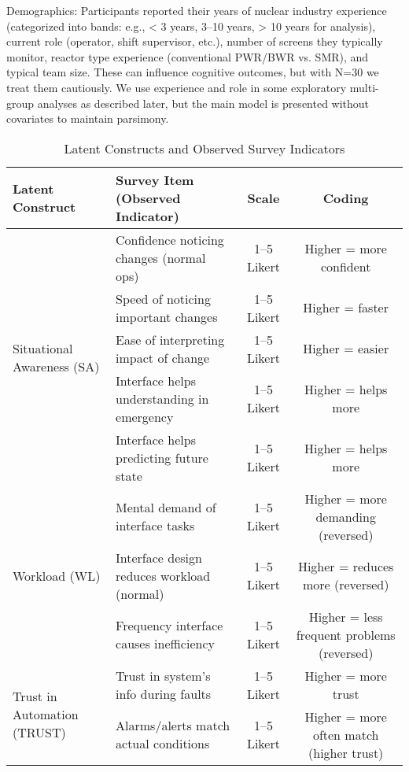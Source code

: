 \documentclass[conference]{IEEEtran}
\begin{document}
Demographics: Participants reported their years of nuclear industry experience (categorized into bands: e.g., < 3 years, 3–10 years, > 10 years for analysis), current role (operator, shift supervisor, etc.), number of screens they typically monitor, reactor type experience (conventional PWR/BWR vs. SMR), and typical team size. These can influence cognitive outcomes, but with N=30 we treat them cautiously. We use experience and role in some exploratory multi-group analyses as described later, but the main model is presented without covariates to maintain parsimony.

\begin{table*}[t]
\caption{Latent Constructs and Observed Survey Indicators}
\centering
\begin{tabular}{llcc}
\toprule
Latent Construct & Survey Item (Observed Indicator) & Scale & Coding \\
\midrule
\multirow{5}{*}{Situational Awareness (SA)} & Confidence noticing changes (normal ops) & 1–5 Likert & Higher = more confident \\
 & Speed of noticing important changes & 1–5 Likert & Higher = faster \\
 & Ease of interpreting impact of change & 1–5 Likert & Higher = easier \\
 & Interface helps understanding in emergency & 1–5 Likert & Higher = helps more \\
 & Interface helps predicting future state & 1–5 Likert & Higher = helps more \\
\midrule
\multirow{3}{*}{Workload (WL)} & Mental demand of interface tasks & 1–5 Likert & Higher = more demanding (reversed) \\
 & Interface design reduces workload (normal) & 1–5 Likert & Higher = reduces more (reversed) \\
 & Frequency interface causes inefficiency & 1–5 Likert & Higher = less frequent problems (reversed) \\
\midrule
\multirow{2}{*}{Trust in Automation (TRUST)} & Trust in system’s info during faults & 1–5 Likert & Higher = more trust \\
 & Alarms/alerts match actual conditions & 1–5 Likert & Higher = more often match (higher trust) \\
\bottomrule
\end{tabular}
\label{tab:constructs}
\end{table*}
\end{document}
